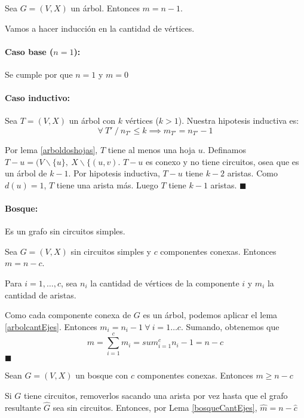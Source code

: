 \begin{lema}\label{arbolcantEjes}
	Sea \(G = (V, X)\) un árbol. Entonces \(m = n - 1\).
\end{lema}
\begin{demo}
	Vamos a hacer inducción en la cantidad de vértices.
	\paragraph{Caso base (\(n = 1\)):} Se cumple por que \(n = 1\) y \(m = 0\)
	\paragraph{Caso inductivo:} Sea \(T = (V, X)\) un árbol con \(k\) vértices (\(k > 1\)). Nuestra hipotesis inductiva es: \[\forall~T' ~/~ n_{T'} \leq k \implies m_{T'} = n_{T'} - 1\]
	
	
	Por lema \ref{arboldoshojas}, \(T\) tiene al menos una hoja \(u\). Definamos \(T - u = (V \backslash \{u\},~X\backslash \{(u,v)\). \(T - u\) es conexo y no tiene circuitos, osea que es un árbol de \(k-1\). Por hipotesis inductiva, \(T - u\) tiene \(k-2\) aristas. Como \(d(u) = 1\), \(T\) tiene una arista más. Luego \(T\) tiene \(k-1\) aristas. \(\blacksquare\)
\end{demo}

\paragraph{Bosque:} Es un grafo sin circuitos simples.
\begin{coro}\label{bosqueCantEjes}
	Sea \(G = (V,X)\) sin circuitos simples y \(c\) componentes conexas. Entonces \(m = n - c\).
\end{coro}
\begin{demo}
Para \(i=1,\dots,c\), sea \(n_i\) la cantidad de vértices de la componente \(i\) y \(m_i\) la cantidad de aristas.

Como cada componente conexa de \(G\) es un árbol, podemos aplicar el lema \ref{arbolcantEjes}. Entonces \(m_i = n_i - 1~\forall~i=1\dots c\). Sumando, obtenemos que \[ m = \sum_{i=1}^{c}m_i = sum_{i=1}^{c}n_i - 1 = n - c\]
\(\blacksquare\)
\end{demo}

\begin{coro}\label{bosqueNC}
	Sean \(G = (V, X)\) un bosque con \(c\) componentes conexas. Entonces \(m \geq n -c\)
\end{coro}
\begin{demo}
	Si \(G\) tiene circuitos, removerlos sacando una arista por vez hasta que el grafo resultante \(\hat{G}\) sea sin circuitos. Entonces, por Lema \ref{bosqueCantEjes}, \(\hat{m} = n - \hat{c}\)
\end{demo}

